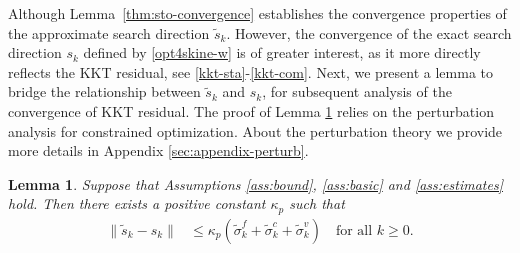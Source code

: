 \documentclass[11pt]{article}
\newtheorem{lemma}{Lemma}
\begin{document}
Although Lemma~\ref{thm:sto-convergence} establishes the convergence properties of the approximate {search direction} $\tilde{s}_k$. However, the convergence of the exact {search direction} $s_k$ defined by \eqref{opt4skine-w} is of greater interest, as it more directly reflects the {KKT residual}, see \eqref{kkt-sta}-\eqref{kkt-com}. Next, we present a lemma to bridge the relationship between $\tilde{s}_k$ and $s_k$, for subsequent analysis of the convergence of KKT residual. The proof of Lemma \ref{lm:sod} relies on the perturbation analysis for constrained optimization. About the perturbation theory we provide more details in Appendix \ref{sec:appendix-perturb}.

\begin{lemma} \label{lm:sod}
    Suppose that Assumptions \ref{ass:bound}, \ref{ass:basic} and \ref{ass:estimates} hold. Then there exists a positive constant \(\kappa_p\) such that
    \begin{align}\label{error-s}
    \|\tilde s_k - s_k \| &\leq \kappa_p (\tilde \sigma_k^f + \tilde \sigma_k^c + \tilde \sigma_k^v)\quad \mbox{for all }k\ge0.
    \end{align}
\end{lemma}
\end{document}
